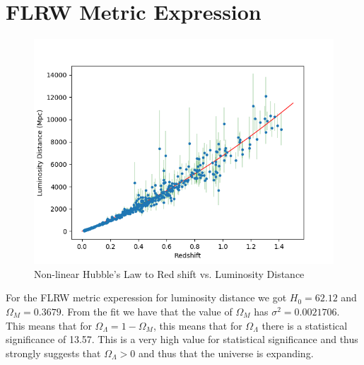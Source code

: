 \documentclass{article}
\begin{document}
\section{FLRW Metric Expression}
\begin{figure}[H]
    \centering
    \includegraphics[width = \textwidth]{Images/nonlinfit.png}
    \caption{Non-linear Hubble's Law to Red shift vs. Luminosity Distance}
    \label{fig:nonlinfit}
\end{figure}
For the FLRW metric experession for luminosity distance we got $H_0 = 62.12$ and $\Omega_M = 0.3679$. From the fit we have that the value of $\Omega_M$  has $\sigma^2 = 0.0021706$. This means that for $\Omega_\Lambda= 1 - \Omega_M$, this means that for $\Omega_\Lambda$ there is a statistical significance of 13.57. This is a very high value for statistical significance and thus strongly suggests that $\Omega_\Lambda > 0$ and thus that the universe is expanding.
\end{document}
